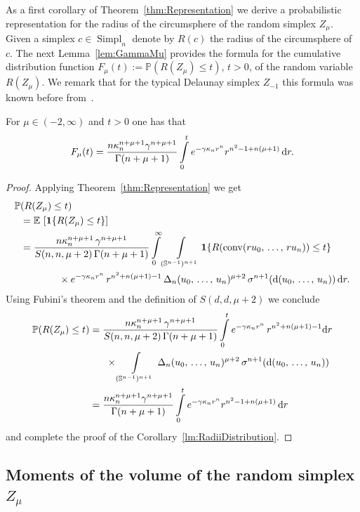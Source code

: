 \documentclass[AHL,Unicode,longabstracts,published]{cedram}
\newcommand{\Sp}{\mathbb S}
\newcommand{\EE}{\mathbb{E}\,}
\newcommand{\PP}{\mathbb{P}}
\newcommand{\dd}{{\rm d}}
\DeclareMathOperator{\Simpl}{Simpl}
\newcommand{\conv}{\mathop{\mathrm{conv}}\nolimits}
\begin{document}
As a first corollary of Theorem~\ref{thm:Representation} we derive a probabilistic representation for the radius of the circumsphere of the random simplex $Z_{\mu}$. Given a simplex $c\in \Simpl_n$ denote by $R(c)$ the radius of the circumsphere of $c$. The next Lemma~\ref{lem:GammaMu} provides the formula for the cumulative distribution function $F_{\mu}(t):=\PP(R(Z_\mu)\leq t)$, $t> 0$, of the random variable $R(Z_\mu)$. We remark that for the typical Delaunay simplex $Z_{-1}$ this formula was known before from~\cite{ENR17}.

\begin{coro}\label{lm:RadiiDistribution}
For $\mu\in(-2,\infty)$ and $t>0$ one has that
\[
F_{\mu}(t)=\frac{n\kappa_n^{n+\mu+1}\gamma^{n+\mu+1}}{\Gamma(n+\mu+1)}\int\limits_{0}^{t}e^{-\gamma\kappa_nr^n}r^{n^2-1+n(\mu+1)}\,\dd r.
\]
\end{coro}

\begin{proof}
Applying Theorem~\ref{thm:Representation} we get
\begin{align*}
\PP&(R(Z_\mu)\leq t)\\
&=\EE\left[{\bf 1}\{R(Z_\mu)\leq t\}\right]\\
&=\frac{n\kappa_n^{n+\mu+1}\,\gamma^{n+\mu+1}}{S(n,n,\mu+2)\,\Gamma(n+\mu+1)}\int\limits_0^\infty\int\limits_{(\Sp^{n-1})^{n+1}}{\bf 1}\{R(\conv(ru_0,\,\ldots,\,ru_n))\leq t\}\\
&\mkern70mu\times e^{-\gamma\kappa_nr^n}\,r^{n^2+n(\mu+1)-1}\,\Delta_n(u_0,\,\ldots,\,u_n)^{\mu+2}\,\sigma^{n+1}(\dd(u_0,\,\ldots,\,u_n))\,\dd r.
\end{align*}
Using Fubini's theorem and the definition of $S(d,d,\mu+2)$ we conclude
\begin{align*}
\PP(R(Z_\mu)\leq t)&=\frac{n\kappa_n^{n+\mu+1}\,\gamma^{n+\mu+1}}{S(n,n,\mu+2)\,\Gamma(n+\mu+1)}\int\limits_0^te^{-\gamma\kappa_nr^n}\,r^{n^2+n(\mu+1)-1}\dd r\\
&\mkern30mu \times \int\limits_{(\Sp^{n-1})^{n+1}}\,\Delta_n(u_0,\,\ldots,\,u_n)^{\mu+2}\,\sigma^{n+1}(\dd(u_0,\,\ldots,\,u_n))\\
&=\frac{n\kappa_n^{n+\mu+1}\gamma^{n+\mu+1}}{\Gamma(n+\mu+1)}\int\limits_{0}^{t}e^{-\gamma\kappa_nr^n}r^{n^2-1+n(\mu+1)}\,\dd r
\end{align*}
and complete the proof of the Corollary~\ref{lm:RadiiDistribution}.
\end{proof}



\subsection{Moments of the volume of the random simplex \texorpdfstring{$Z_\mu$}{Z mu}}
\end{document}
